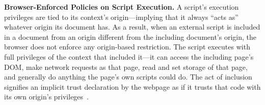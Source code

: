 

\noindent \textbf{Browser-Enforced Policies on Script Execution.} 
%
A script's execution privileges are tied to its context’s origin---implying that it always ``acts as'' whatever origin its document has.
%
As a result, when an external script is included in a document from an origin different from the including document's origin, the browser does not enforce any origin-based restriction.
%
The script executes with full privileges of the context that included it---it can access the including page’s DOM, make network requests as that page, read and set storage of that page, and generally do anything the page’s own scripts could do. 
%
The act of inclusion signifies an implicit trust declaration by the webpage as if it trusts that code with its own origin’s privileges~\cite{WebKitTrackingPrevention}. 


